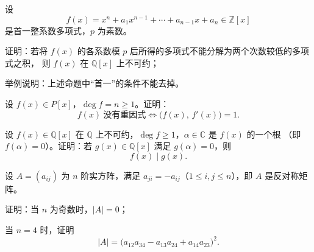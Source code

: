 \documentclass[11pt,a4paper,fontset=windows]{ctexart}
\begin{document}
\begin{qs}[resume*]
\item 设
\[
f(x)=x^{n}+a_1x^{n-1}+\cdots+a_{n-1}x+a_n\in\mathbb{Z}[x]
\]
是首一整系数多项式，$p$ 为素数。
\begin{sub}
\item 证明：若将 $f(x)$ 的各系数模 $p$ 后所得的多项式不能分解为两个次数较低的多项式之积，
      则 $f(x)$ 在 $\mathbb{Q}[x]$ 上不可约；
\item 举例说明：上述命题中“首一”的条件不能去掉。
\end{sub}

\item 设 $f(x)\in P[x]$，$\deg f=n\ge 1$。证明：
\[
f(x)\ \text{没有重因式}\iff \bigl(f(x),\,f'(x)\bigr)=1 .
\]

\item 设 $f(x)\in\mathbb{Q}[x]$ 在 $\mathbb{Q}$ 上不可约，$\deg f\ge 1$，$\alpha\in\mathbb{C}$ 是 $f(x)$ 的一个根
（即 $f(\alpha)=0$）。证明：若 $g(x)\in\mathbb{Q}[x]$ 满足 $g(\alpha)=0$，则
\[
f(x)\mid g(x).
\]

\item 设 $A=(a_{ij})$ 为 $n$ 阶实方阵，满足 $a_{ji}=-a_{ij}$（$1\le i,j\le n$），即 $A$ 是反对称矩阵。
\begin{sub}
\item 证明：当 $n$ 为奇数时，$|A|=0$；
\item 当 $n=4$ 时，证明
\[
|A|=\bigl(a_{12}a_{34}-a_{13}a_{24}+a_{14}a_{23}\bigr)^{2}.
\]
\end{sub}
\end{qs}
\end{document}
